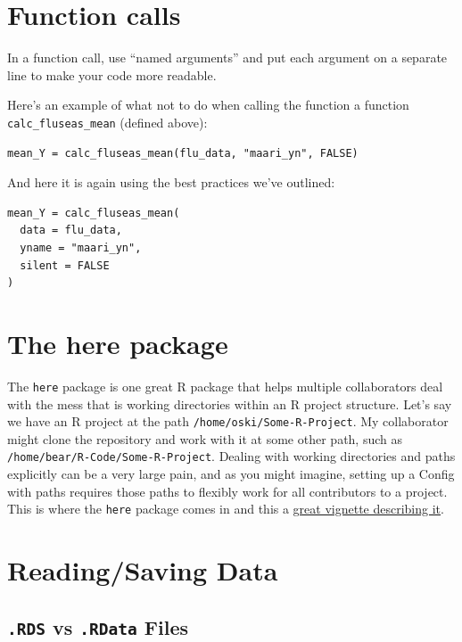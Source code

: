 \documentclass[
]{book}
\begin{document}
\section{Function calls}\label{function-calls}

In a function call, use ``named arguments'' and put each argument on a separate line to make your code more readable.

Here's an example of what not to do when calling the function a function \texttt{calc\_fluseas\_mean} (defined above):

\begin{verbatim}
mean_Y = calc_fluseas_mean(flu_data, "maari_yn", FALSE)
\end{verbatim}

And here it is again using the best practices we've outlined:

\begin{verbatim}
mean_Y = calc_fluseas_mean(
  data = flu_data, 
  yname = "maari_yn",
  silent = FALSE
)
\end{verbatim}

\section{The here package}\label{the-here-package}

The \texttt{here} package is one great R package that helps multiple collaborators deal with the mess that is working directories within an R project structure. Let's say we have an R project at the path \texttt{/home/oski/Some-R-Project}. My collaborator might clone the repository and work with it at some other path, such as \texttt{/home/bear/R-Code/Some-R-Project}. Dealing with working directories and paths explicitly can be a very large pain, and as you might imagine, setting up a Config with paths requires those paths to flexibly work for all contributors to a project. This is where the \texttt{here} package comes in and this a \href{https://github.com/jennybc/here_here}{great vignette describing it}.

\section{Reading/Saving Data}\label{readingsaving-data}

\subsection{\texorpdfstring{\texttt{.RDS} vs \texttt{.RData} Files}{.RDS vs .RData Files}}\label{rds-vs-.rdata-files}
\end{document}
